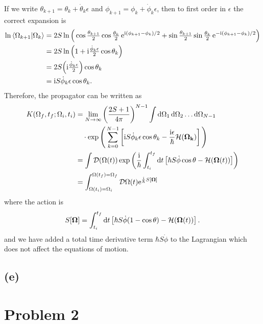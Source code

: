 \documentclass{article}
\newcommand{\ii}{\mathrm{i}}
\newcommand{\me}{\mathrm{e}}
\newcommand{\cd}{\mathcal{D}}
\begin{document}
If we write $\theta_{k+1}=\theta_k+\dot{\theta}_k\epsilon$ and $\phi_{k+1}=\phi_k+\dot{\phi}_k\epsilon$, then to first order in $\epsilon$ the correct expansion is
\begin{equation}
    \begin{split}
        \ln{\bra{\Omega_{k+1}}\ket{\Omega_k}}&=2S\ln\Big(\cos\tfrac{\theta_{k+1}}{2}\cos\tfrac{\theta_k}{2}\,\me^{\ii(\phi_{k+1}-\phi_k)/2}+\sin\tfrac{\theta_{k+1}}{2}\sin\tfrac{\theta_k}{2}\,\me^{-\ii(\phi_{k+1}-\phi_k)/2}\Big)\\
        &=2S\ln\Big(1+\ii\tfrac{\dot{\phi}_k\epsilon}{2}\cos\theta_k\Big)\\
        &=2S\Big(\ii\tfrac{\dot{\phi}_k\epsilon}{2}\Big)\cos\theta_k\\
        &=\ii S\dot{\phi}_k\epsilon\cos\theta_k.
    \end{split}
\end{equation}
Therefore, the propagator can be written as
\begin{equation}
    \begin{split}
        K(\Omega_f,t_f;\Omega_i,t_i)&=\lim_{N\to\infty}\left(\frac{2S+1}{4\pi}\right)^{N-1}\int \dd{\Omega_1}\dd{\Omega_2}\dots\dd{\Omega_{N-1}}\\
        &\quad \cdot \exp\Bigg(\sum_{k=0}^{N-1}\left[\ii S\dot{\phi}_k\epsilon\cos\theta_k -\frac{\ii\epsilon}{\hbar}\mathcal{H}(\vb{\Omega_k})\right]\Bigg)\\
        &=\int \cd{(\Omega(t))}\exp\left(\frac{\ii}{\hbar}\int_{t_i}^{t_f}\dd{t}\left[\hbar S \dot{\phi}\cos\theta-\mathcal{H}(\vb{\Omega}(t))\right]\right)\\
        &=\int_{\Omega(t_i)=\Omega_i}^{\Omega(t_f)=\Omega_f}\cd\Omega(t)\me^{\frac{\ii}{\hbar}S[\vb{\Omega}]}
    \end{split}
\end{equation}
where the action is
\begin{equation}
    S[\vb{\Omega}]=\int_{t_i}^{t_f}\dd{t}\left[\hbar S \dot{\phi}(1-\cos\theta)-\mathcal{H}(\vb{\Omega}(t))\right].
\end{equation}
and we have added a total time derivative term $\hbar S \dot{\phi}$ to the Lagrangian which does not affect the equations of motion.

\subsection*{(e)}

\section*{Problem 2}
\end{document}
